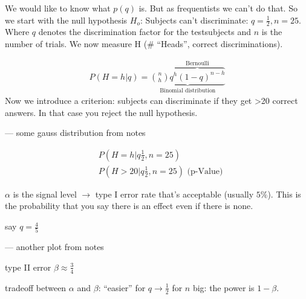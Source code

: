 We would like to know what $p(q)$ is. But as frequentists we can't do that. So we start with the null hypothesis $H_o$: Subjects can't discriminate: $q = \frac{1}{2}, n = 25$. Where $q$ denotes the discrimination factor for the testsubjects and $n$ is the number of trials. We now measure H (\# ``Heads'', correct discriminations).

\begin{align*}
P(H=h|q) = \underbrace{ \binom{n}{h} \overbrace{q^h (1-q)^{n-h}}^\text{Bernoulli} }_\text{Binomial distribution}
\end{align*}
Now we introduce a criterion: subjects can discriminate if they get >20 correct answers. In that case you reject the null hypothesis.

--- some gauss distribution from notes

\begin{align*}
&P\left(H=h |q\frac{1}{2},n=25\right) \\
&P\left(H>20 |q\frac{1}{2},n=25\right) \mbox{ (p-Value)}
\end{align*}

$\alpha$ is the signal level $\rightarrow$ type I error rate that's acceptable (usually $5\%$). This is the probability that you say there is an effect even if there is none.

say $q = \frac{4}{5}$

--- another plot from notes

type II error $\beta \approx \frac{3}{4}$

tradeoff between $\alpha$ and $\beta$: ``easier'' for $q \rightarrow \frac{1}{2}$ for $n$ big: the power is $1-\beta$.